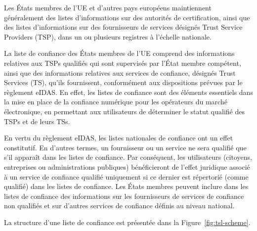 \documentclass{tnreport}
\begin{document}
Les États membres de l'UE et d'autres pays européens maintiennent généralement des listes d'informations sur des autorités de certification, ainsi que des listes d'informations sur des fournisseurs de services
désignés Trust Service Providers (TSP), dans un ou plusieurs registres à l'échelle nationale.

La liste de confiance des États membres de l'UE comprend des informations relatives aux TSPs qualifiés qui sont supervisés par l'État membre compétent, ainsi que des informations relatives aux services de confiance, désignés Trust Services (TS), qu'ils fournissent, conformément aux dispositions prévues par le règlement eIDAS.
En effet, les listes de confiance sont des éléments essentiels dans la mise en place de la confiance numérique pour les opérateurs du marché électronique, en permettant aux utilisateurs de déterminer le statut qualifié des TSPs et de leurs TSs.

En vertu du règlement eIDAS, les listes nationales de confiance ont un effet constitutif.
En d'autres termes, un fournisseur ou un service ne sera qualifié que s'il apparaît dans les listes de confiance. Par conséquent, les utilisateurs (citoyens, entreprises ou administrations publiques) bénéficieront de l'effet juridique associé à un service de confiance qualifié uniquement si ce dernier est répertorié (comme qualifié) dans les listes de confiance.	
Les États membres peuvent inclure dans les listes de confiance des informations sur les fournisseurs de services de confiance non qualifiés et sur d'autres services de confiance définis au niveau national.

La structure d'une liste de confiance est présentée dans la Figure~\ref{fig:tsl-scheme}.
\end{document}
